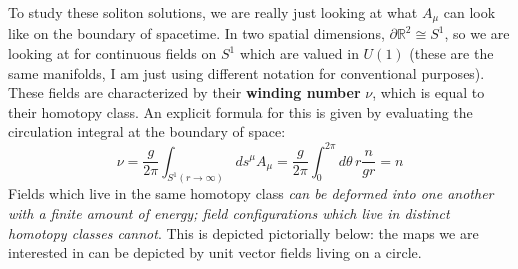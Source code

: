 \documentclass[11pt, oneside]{article}   	%
\theoremstyle{definition}
\begin{document}
To study these soliton solutions, we are really just looking at what $A_\mu$ can look like on the boundary of spacetime. In two spatial dimensions, 
$\partial\mathbb R^2\cong S^1$, so we are looking at for continuous fields on $S^1$ which are valued in $U(1)$ (these are the same manifolds, 
I am just using different notation for conventional purposes). These fields are characterized by their \textbf{winding number} $\nu$, which is equal to their 
homotopy class. An explicit formula for this is given by evaluating the circulation integral at the boundary of space:
\begin{equation}
	\nu = \frac{g}{2\pi} \int_{S^1(r\rightarrow\infty)} ds^\mu A_\mu = \frac{g}{2\pi} \int_0^{2\pi} d\theta\, r\frac{n}{gr} = n
\end{equation}
Fields which live in the same homotopy class \textit{can be deformed into one another with a finite amount of energy; field configurations which live in distinct 
homotopy classes cannot}. This is depicted pictorially below: the maps we are interested in can be depicted by unit vector fields 
living on a circle.
\end{document}
